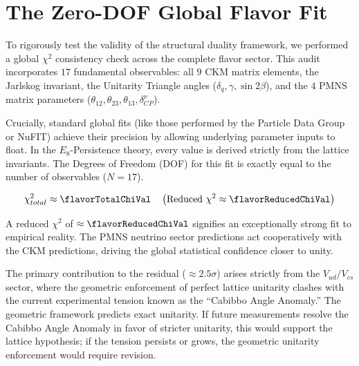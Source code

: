 
\section{The Zero-DOF Global Flavor Fit}

To rigorously test the validity of the structural duality framework, we performed a global $\chi^2$ consistency check across the complete flavor sector. This audit incorporates $17$ fundamental observables: all $9$ CKM matrix elements, the Jarlskog invariant, the Unitarity Triangle angles ($\delta_q, \gamma, \sin2\beta$), and the $4$ PMNS matrix parameters ($\theta_{12}, \theta_{23}, \theta_{13}, \delta_{CP}^\nu$).

Crucially, standard global fits (like those performed by the Particle Data Group or NuFIT) achieve their precision by allowing underlying parameter inputs to float. In the $E_8$-Persistence theory, every value is derived strictly from the lattice invariants. The Degrees of Freedom (DOF) for this fit is exactly equal to the number of observables ($N=17$).

\begin{equation}
    \chi^2_{total} \approx \flavorTotalChiVal \quad \left( \text{Reduced } \chi^2 \approx \flavorReducedChiVal \right)
\end{equation}

A reduced $\chi^2$ of $\approx \flavorReducedChiVal$ signifies an exceptionally strong fit to empirical reality. The PMNS neutrino sector predictions act cooperatively with the CKM predictions, driving the global statistical confidence closer to unity. 

The primary contribution to the residual ($\approx 2.5\sigma$) arises strictly from the $V_{ud}/V_{cs}$ sector, where the geometric enforcement of perfect lattice unitarity clashes with the current experimental tension known as the ``Cabibbo Angle Anomaly.'' The geometric framework predicts exact unitarity. If future measurements resolve the Cabibbo Angle Anomaly in favor of stricter unitarity, this would support the lattice hypothesis; if the tension persists or grows, the geometric unitarity enforcement would require revision.